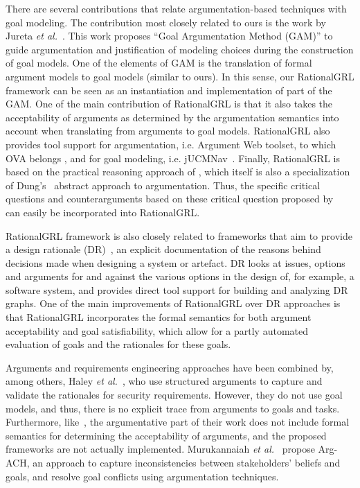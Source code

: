 \documentclass[11.5pt,two column]{llncs}
\begin{document}
There are several contributions that relate argumentation-based techniques with goal modeling. The contribution most closely related to ours is the work by Jureta \emph{et al.}~\cite{Jureta:RE2008}. This work proposes ``Goal Argumentation Method (GAM)'' to guide argumentation and justification of modeling choices during the construction of goal models. One of the elements of GAM is the translation of formal argument models to goal models (similar to ours). In this sense, our \textsf{RationalGRL} framework can be seen as an instantiation and implementation of  part of the GAM. One of the main contribution of \textsf{RationalGRL} is that it also takes the acceptability of arguments as determined by the argumentation semantics \cite{Dung1995} into account when translating from arguments to goal models.  \textsf{RationalGRL} also provides tool support for argumentation, i.e. Argument Web toolset, to which OVA belongs \cite{bex2013implementing}, and for goal modeling, i.e. jUCMNav~\cite{jUCMNav}. Finally, \textsf{RationalGRL} is based on the practical reasoning approach of \cite{Atkinson2014}, which itself is also a specialization of Dung's~\cite{Dung1995} abstract approach to argumentation. Thus, the specific critical questions and counterarguments based on these critical question proposed by~\cite{Atkinson2014} can easily be incorporated into \textsf{RationalGRL}. 

\textsf{RationalGRL} framework is also closely related to frameworks that aim to provide a design rationale (DR)~\cite{shum2006hypermedia}, an explicit documentation of the reasons behind decisions made when designing a system or artefact. DR looks at issues, options and arguments for and against the various options in the design of, for example, a software system, and provides direct tool support for building and analyzing DR graphs. One of the main improvements of \textsf{RationalGRL} over DR approaches is that \textsf{RationalGRL} incorporates the formal semantics for both argument acceptability and goal satisfiability, which allow for a partly automated evaluation of goals and the rationales for these goals. 

Arguments and requirements engineering approaches have been combined by, among others, Haley \emph{et al.}~\cite{haley2005arguing}, who use structured arguments to capture and validate the rationales for security requirements. However, they do not use goal models, and thus, there is no explicit trace from arguments to goals and tasks. Furthermore, like~\cite{Jureta:RE2008}, the argumentative part of their work does not include formal semantics for determining the acceptability of arguments, and the proposed frameworks are not actually implemented. Murukannaiah \emph{et al.}~\cite{murukannaiah2015resolving} propose Arg-ACH, an approach to capture inconsistencies between stakeholders' beliefs and goals, and resolve goal conflicts using argumentation techniques.
\end{document}

